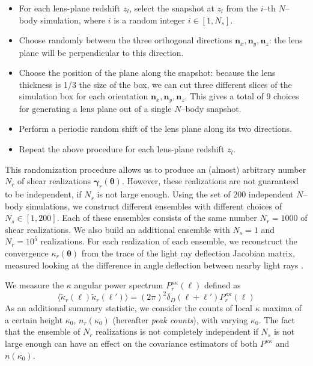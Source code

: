\documentclass[reprint,aps,prd,superscriptaddress,showkeys,showpacs]{revtex4-1}
\newcommand{\bb}[1]{\mathbf{#1}}
\begin{document}
\begin{itemize}
\item For each lens-plane redshift $z_l$, select the snapshot at $z_l$ from the $i$--th $N$--body simulation, where $i$ is a random integer $i\in [1,N_s]$.
\item Choose randomly between the three orthogonal directions ${\bb{n}_x,\bb{n}_y,\bb{n}_z}$: the lens plane will be perpendicular to this direction.
\item Choose the position of the plane along the snapshot: because the lens thickness is 1/3 the size of the box, we can cut three different slices of the simulation box for each orientation ${\bb{n}_x,\bb{n}_y,\bb{n}_z}$. This gives a total of 9 choices for generating a lens plane out of a single $N$--body snapshot.
\item Perform a periodic random shift of the lens plane along its two directions.
\item Repeat the above procedure for each lens-plane redshift $z_l$.
\end{itemize}  
%
This randomization procedure allows us to produce an (almost)
arbitrary number $N_r$ of shear realizations
$\pmb{\gamma}_r(\pmb{\theta})$. However, these realizations are not
guaranteed to be independent, if $N_s$ is not large enough. Using the
set of 200 independent $N$--body simulations, we construct different
ensembles with different choices of $N_s\in[1,200]$. Each of these
ensembles consists of the same number $N_r=1000$ of shear
realizations. We also build an additional ensemble with $N_s=1$ and
$N_r=10^5$ realizations. For each realization of each ensemble, we
reconstruct the convergence $\kappa_r(\pmb{\theta})$ from the trace of the light ray deflection Jacobian matrix, measured looking at the difference in angle deflection between nearby light rays \citep{RayTracingHartlap,RayTracingJain,Sato12}.

We measure the $\kappa$ angular power spectrum $P^{\kappa\kappa}_r(\ell)$ defined as
\begin{equation}
\langle\tilde{\kappa}_r(\pmb{\ell})\tilde{\kappa}_r(\pmb{\ell}')\rangle = (2\pi)^2\delta_D(\pmb{\ell}+\pmb{\ell}')P^{\kappa\kappa}_r(\ell)
\end{equation}
%
As an additional summary statistic, we consider the counts of local
$\kappa$ maxima of a certain height $\kappa_0$, $n_r(\kappa_0)$
(hereafter \textit{peak counts}), with varying $\kappa_0$.
The fact that the ensemble of $N_r$ realizations is not completely
independent if $N_s$ is not large enough can have an effect on the
covariance estimators of both $P^{\kappa\kappa}$ and $n(\kappa_0)$.
\end{document}
